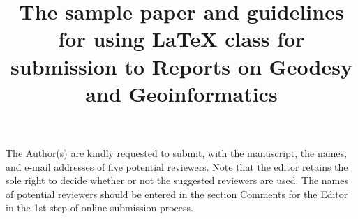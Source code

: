 \documentclass{rog}
\begin{document}
    \title{The sample paper and guidelines for using \LaTeX{} class for submission to Reports on Geodesy and Geoinformatics}
    \maketitle
    The Author(s) are kindly requested to submit, with the manuscript, the names, and e-mail addresses of five potential reviewers. Note that the editor retains the sole right to decide whether or not the suggested reviewers are used. The names of potential reviewers should be entered in the section Comments for the Editor in the 1st step of online submission process.
    \cite{hw1997}
\end{document}
